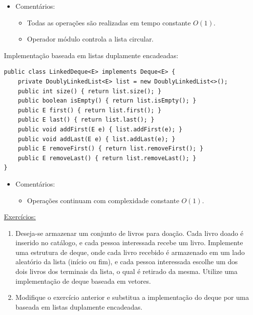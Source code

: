 \medskip

\begin{itemize}
	\color{redtext}
	\item Comentários:
	\begin{itemize}
		\item Todas as operações são realizadas em tempo constante $O(1)$.
		\item Operador módulo controla a lista circular.
	\end{itemize}
\end{itemize}

\medskip


Implementação baseada em listas duplamente encadeadas:
\begin{verbatim}
public class LinkedDeque<E> implements Deque<E> {
	private DoublyLinkedList<E> list = new DoublyLinkedList<>();
	public int size() { return list.size(); }
	public boolean isEmpty() { return list.isEmpty(); }
	public E first() { return list.first(); }
	public E last() { return list.last(); }
	public void addFirst(E e) { list.addFirst(e); }
	public void addLast(E e) { list.addLast(e); }
	public E removeFirst() { return list.removeFirst(); }
	public E removeLast() { return list.removeLast(); }
}
\end{verbatim}

\medskip

\begin{itemize}
	\color{redtext}
	\item Comentários:
	\begin{itemize}
		\item Operações continuam com complexidade constante $O(1)$.
	\end{itemize}
\end{itemize}

\clearpage

\underline{Exercícios:}
\begin{enumerate}
	\item Deseja-se armazenar um conjunto de livros para doação. Cada livro doado é inserido no catálogo, e cada pessoa interessada recebe um livro. Implemente uma estrutura de deque, onde cada livro recebido é armazenado em um lado aleatório da lista (início ou fim), e cada pessoa interessada escolhe um dos dois livros dos terminais da lista, o qual é retirado da mesma. Utilize uma implementação de deque baseada em vetores.
	
	\item Modifique o exercício anterior e substitua a implementação do deque por uma baseada em listas duplamente encadeadas.
\end{enumerate}

